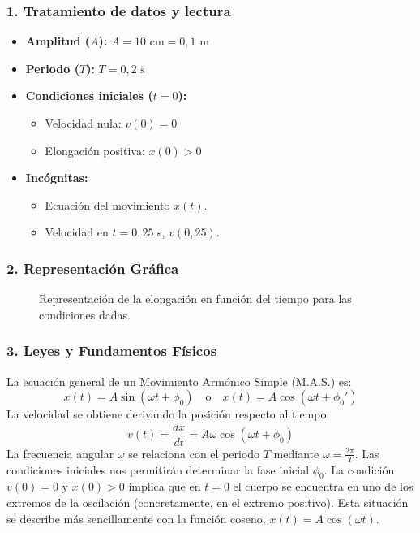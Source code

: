 \subsubsection*{1. Tratamiento de datos y lectura}
\begin{itemize}
    \item \textbf{Amplitud ($A$):} $A = 10 \text{ cm} = 0,1 \text{ m}$
    \item \textbf{Periodo ($T$):} $T = 0,2 \text{ s}$
    \item \textbf{Condiciones iniciales ($t=0$):}
        \begin{itemize}
            \item Velocidad nula: $v(0) = 0$
            \item Elongación positiva: $x(0) > 0$
        \end{itemize}
    \item \textbf{Incógnitas:}
        \begin{itemize}
            \item Ecuación del movimiento $x(t)$.
            \item Velocidad en $t=0,25$ s, $v(0,25)$.
        \end{itemize}
\end{itemize}

\subsubsection*{2. Representación Gráfica}
\begin{figure}[H]
    \centering
    \caption{Representación de la elongación en función del tiempo para las condiciones dadas.}
\end{figure}

\subsubsection*{3. Leyes y Fundamentos Físicos}
La ecuación general de un Movimiento Armónico Simple (M.A.S.) es:
$$x(t) = A \sin(\omega t + \phi_0) \quad \text{o} \quad x(t) = A \cos(\omega t + \phi_0')$$
La velocidad se obtiene derivando la posición respecto al tiempo:
$$v(t) = \frac{dx}{dt} = A\omega \cos(\omega t + \phi_0)$$
La frecuencia angular $\omega$ se relaciona con el periodo $T$ mediante $\omega = \frac{2\pi}{T}$.
Las condiciones iniciales nos permitirán determinar la fase inicial $\phi_0$. La condición $v(0)=0$ y $x(0)>0$ implica que en $t=0$ el cuerpo se encuentra en uno de los extremos de la oscilación (concretamente, en el extremo positivo). Esta situación se describe más sencillamente con la función coseno, $x(t) = A\cos(\omega t)$.

